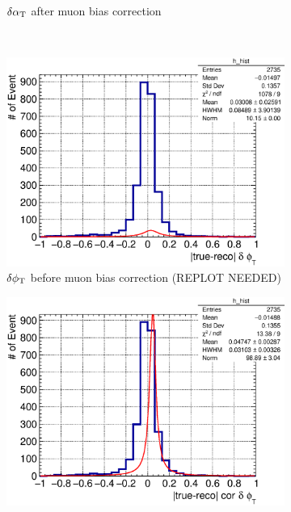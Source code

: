 \begin{figure}
\begin{subfigure}[b]{\dbfigwid\textwidth}
               \caption{$\delta\alpha_\textrm{T}$ after muon bias correction}
               \label{subfig:esc-dalpha-afmu}
          \end{subfigure}         
          \\
          \begin{subfigure}[b]{\dbfigwid\textwidth}
               \centering
               \includegraphics[width=\textwidth]{figures/perf/tki/dphit_rat_hist_al14.eps}
               \caption{$\delta\phi_\textrm{T}$ before muon bias correction (REPLOT NEEDED)}
               \label{subfig:esc-dphit-bfmu}
          \end{subfigure}
          \begin{subfigure}[b]{\dbfigwid\textwidth}
               \centering
               \includegraphics[width=\textwidth]{figures/perf/tki/cor_dphit_rat_hist_al14.eps}

\end{subfigure}
\end{figure}

